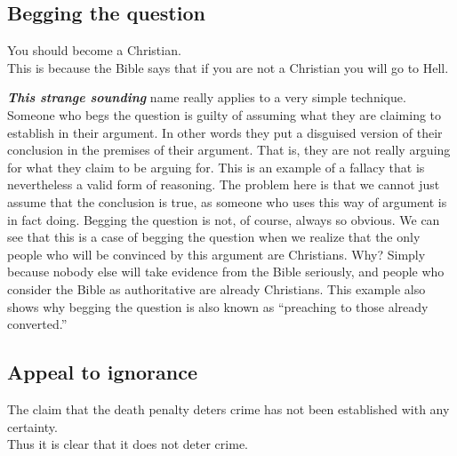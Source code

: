 \documentclass[12pt, openany]{book}
\begin{document}
\hypertarget{begging-the-question}{%
\subsection*{Begging the question}\label{begging-the-question}}


\begin{center}

\begin{argument}

You should become a Christian.\\
This is because the Bible says that if you are not a Christian you will go to Hell.

\end{argument}

\end{center}

\textbf{\emph{This strange sounding}} name really applies to a very simple technique. Someone who begs the question is guilty of assuming what they are claiming to establish in their argument. In other words they put a disguised version of their conclusion in the premises of their argument. That is, they are not really arguing for what they claim to be arguing for. This is an example of a fallacy that is nevertheless a valid form of reasoning. The problem here is that we cannot just assume that the conclusion is true, as someone who uses this way of argument is in fact doing. Begging the question is not, of course, always so obvious. We can see that this is a case of begging the question when we realize that the only people who will be convinced by this argument are Christians. Why? Simply because nobody else will take evidence from the Bible seriously, and people who consider the Bible as authoritative are already Christians. This example also shows why begging the question is also known as ``preaching to those already converted.''

\hypertarget{appeal-to-ignorance}{%
\subsection*{Appeal to ignorance}\label{appeal-to-ignorance}}


\begin{center}

\begin{argument}

The claim that the death penalty deters crime has not been established with any certainty.\\
Thus it is clear that it does not deter crime.

\end{argument}

\end{center}
\end{document}
